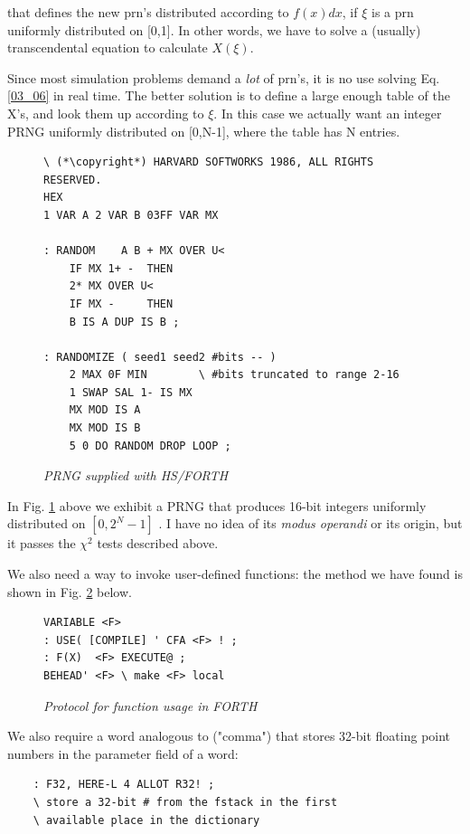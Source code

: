 that defines the new prn's distributed according to $f(x)dx$, if $\xi$ is a prn uniformly distributed on [0,1]. In other words, we have to solve a (usually) transcendental equation to calculate $X(\xi)$.

Since most simulation problems demand a \textit{lot} of prn's, it is no use solving Eq. \ref{03_06} in real time. The better solution is to define a large enough table of the X's, and look them up according to $\xi$. In this case we actually want an integer PRNG uniformly distributed on [0,N-1], where the table has N entries.

\begin{figure}[h]
        \begin{lstlisting}
\ (*\copyright*) HARVARD SOFTWORKS 1986, ALL RIGHTS RESERVED.
HEX
1 VAR A 2 VAR B 03FF VAR MX

: RANDOM    A B + MX OVER U<
    IF MX 1+ -  THEN
    2* MX OVER U<
    IF MX -     THEN
    B IS A DUP IS B ;

: RANDOMIZE ( seed1 seed2 #bits -- )
    2 MAX 0F MIN        \ #bits truncated to range 2-16
    1 SWAP SAL 1- IS MX
    MX MOD IS A
    MX MOD IS B
    5 0 DO RANDOM DROP LOOP ;
        \end{lstlisting}
    \caption{\textit{PRNG supplied with HS/FORTH}}
    \label{fig:03_03}
\end{figure}

In Fig. \ref{fig:03_03} above we exhibit a PRNG that produces 16-bit integers uniformly distributed on $[0, 2^N-1]$ . I have no idea of its \textit{modus operandi} or its origin, but it passes the $\chi^2$ tests described above.

We also need a way to invoke user-defined functions: the method we have found is shown in Fig. \ref{fig:03_04} below.

\begin{figure}[h]
    \begin{lstlisting}
VARIABLE <F>
: USE( [COMPILE] ' CFA <F> ! ;
: F(X)  <F> EXECUTE@ ;
BEHEAD' <F> \ make <F> local
    \end{lstlisting}
    \caption{\textit{Protocol for function usage in FORTH}}
    \label{fig:03_04}
\end{figure}

We also require a word analogous to \bc{,} ("comma") that stores 32-bit floating point numbers in the parameter field of a word:

\begin{lstlisting}
    : F32, HERE-L 4 ALLOT R32! ;
    \ store a 32-bit # from the fstack in the first
    \ available place in the dictionary
\end{lstlisting}

